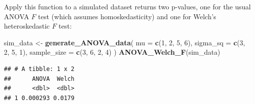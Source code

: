 \documentclass[
]{book}
\newenvironment{Shaded}{\begin{snugshade}}{\end{snugshade}}
\newcommand{\AttributeTok}[1]{\textcolor[rgb]{0.13,0.29,0.53}{#1}}
\newcommand{\ConstantTok}[1]{\textcolor[rgb]{0.56,0.35,0.01}{#1}}
\newcommand{\ControlFlowTok}[1]{\textcolor[rgb]{0.13,0.29,0.53}{\textbf{#1}}}
\newcommand{\DecValTok}[1]{\textcolor[rgb]{0.00,0.00,0.81}{#1}}
\newcommand{\FunctionTok}[1]{\textcolor[rgb]{0.13,0.29,0.53}{\textbf{#1}}}
\newcommand{\NormalTok}[1]{#1}
\newcommand{\OtherTok}[1]{\textcolor[rgb]{0.56,0.35,0.01}{#1}}
\newcommand{\SpecialCharTok}[1]{\textcolor[rgb]{0.81,0.36,0.00}{\textbf{#1}}}
\begin{document}
\begin{Shaded}
\end{Shaded}

Apply this function to a simulated dataset returns two p-values, one for the usual ANOVA \(F\) test (which assumes homoskedasticity) and one for Welch's heteroskedastic \(F\) test:

\begin{Shaded}
\begin{Highlighting}[]
\NormalTok{sim\_data }\OtherTok{\textless{}{-}} \FunctionTok{generate\_ANOVA\_data}\NormalTok{(}
  \AttributeTok{mu =} \FunctionTok{c}\NormalTok{(}\DecValTok{1}\NormalTok{, }\DecValTok{2}\NormalTok{, }\DecValTok{5}\NormalTok{, }\DecValTok{6}\NormalTok{), }
  \AttributeTok{sigma\_sq =} \FunctionTok{c}\NormalTok{(}\DecValTok{3}\NormalTok{, }\DecValTok{2}\NormalTok{, }\DecValTok{5}\NormalTok{, }\DecValTok{1}\NormalTok{),}
  \AttributeTok{sample\_size =} \FunctionTok{c}\NormalTok{(}\DecValTok{3}\NormalTok{, }\DecValTok{6}\NormalTok{, }\DecValTok{2}\NormalTok{, }\DecValTok{4}\NormalTok{)}
\NormalTok{)}
\FunctionTok{ANOVA\_Welch\_F}\NormalTok{(sim\_data)}
\end{Highlighting}
\end{Shaded}

\begin{verbatim}
## # A tibble: 1 x 2
##      ANOVA  Welch
##      <dbl>  <dbl>
## 1 0.000293 0.0179
\end{verbatim}
\end{document}
